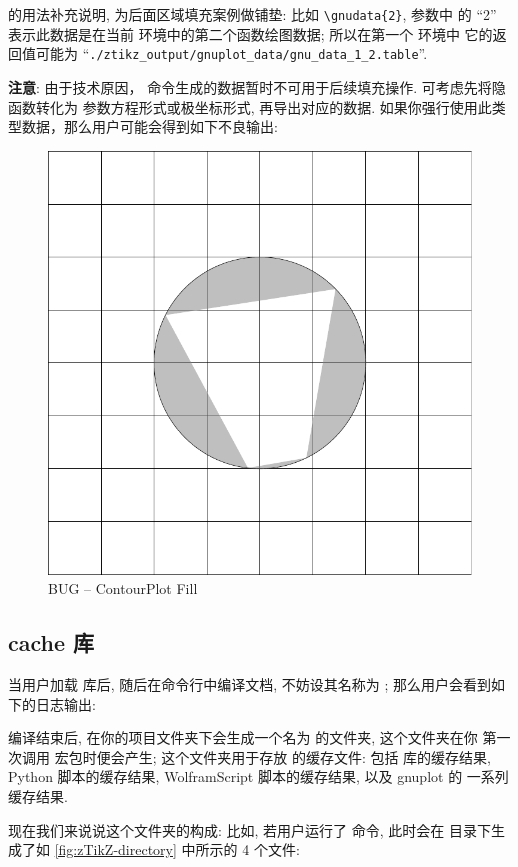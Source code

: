 \documentclass[
  hyper, lang=cn, 
  class=l3dox, 
]{../../zlatex/code/ztex}
\begin{document}
\cmd{\gnudata} 的用法补充说明, 为后面区域填充案例做铺垫: 比如 \verb|\gnudata{2}|, 参数中
的 ``2'' 表示此数据是在当前  环境中的第二个函数绘图数据; 所以在第一个  环境中
它的返回值可能为 ``\texttt{./ztikz_output/gnuplot_data/gnu_data_1_2.table}''.\par 
\textbf{注意}: 由于技术原因，\cmd{\ContourPlot} 命令生成的数据暂时不可用于后续填充操作. 可考虑先将隐函数转化为
参数方程形式或极坐标形式, 再导出对应的数据. 如果你强行使用此类型数据，那么用户可能会得到如下不良输出:
\begin{figure}[H]
  \centering
  \includegraphics[width=.3\linewidth]{./support//pics/contour_data_bug.pdf}
  \caption{BUG -- ContourPlot Fill}
  \label{fig:ContourPlot Fill Bug}
\end{figure}


\clearpage
\subsection{cache 库}
当用户加载  库后, 随后在命令行中编译文档, 不妨设其名称为 ; 那么用户会看到如下的日志输出:


\def\exampleUR{}


编译结束后, 在你的项目文件夹下会生成一个名为  的文件夹, 这个文件夹在你
第一次调用  宏包时便会产生; 这个文件夹用于存放 \zTikZ{} 的缓存文件: 包括 \TikZ{} 
 库的缓存结果, Python 脚本的缓存结果, WolframScript 脚本的缓存结果, 以及 gnuplot 的 
一系列缓存结果.

现在我们来说说这个文件夹的构成: 比如, 若用户运行了 \cmd{\Plot} 命令, 此时会在  
目录下生成了如 \cref{fig:zTikZ-directory} 中所示的 4 个文件:
\end{document}
